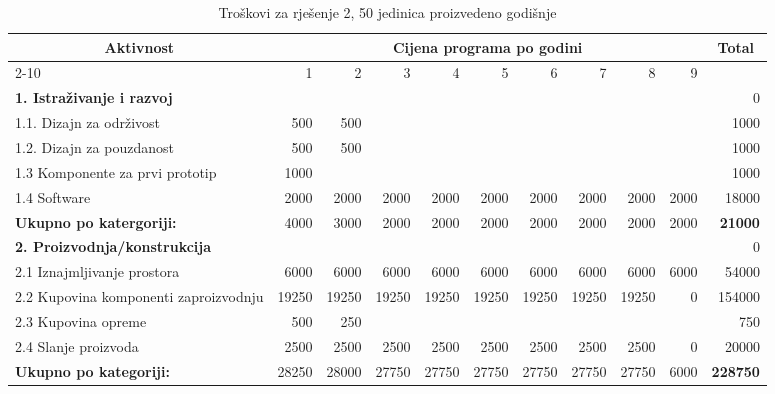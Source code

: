 \documentclass[12pt]{article}
\begin{document}
\begin{landscape}
\begin{table}[htbp]
  \centering
  \small
  \caption{Troškovi za rješenje 2, 50 jedinica proizvedeno godišnje}
    \begin{tabular}{lrrrrrrrrrr}
    \toprule
    \multicolumn{1}{c}{\multirow{2}[4]{*}{Aktivnost}} & \multicolumn{9}{c}{Cijena programa po godini}                         & \multicolumn{1}{c}{\multirow{2}[4]{*}{Total}} \\
\cmidrule{2-10}          & 1     & 2     & 3     & 4     & 5     & 6     & 7     & 8     & 9     &  \\
    \midrule
\textbf{1. Istraživanje i razvoj} &       &       &       &       &       &       &       &       &       & 0 \\
    1.1. Dizajn za održivost & 500   & 500   &       &       &       &       &       &       &       & 1000 \\
    1.2. Dizajn za pouzdanost & 500   & 500   &       &       &       &       &       &       &       & 1000 \\
    1.3 Komponente za prvi prototip & 1000  &       &       &       &       &       &       &       &       & 1000 \\
    1.4 Software & 2000  & 2000  & 2000  & 2000  & 2000  & 2000  & 2000  & 2000  & 2000  & 18000 \\
    \midrule
    \textbf{Ukupno po katergoriji:} & 4000  & 3000  & 2000  & 2000  & 2000  & 2000  & 2000  & 2000  & 2000  & \textbf{21000} \\
    \midrule
    \textbf{2. Proizvodnja/konstrukcija} &       &       &       &       &       &       &       &       &       & 0 \\
    2.1 Iznajmljivanje prostora & 6000  & 6000  & 6000  & 6000  & 6000  & 6000  & 6000  & 6000  & 6000  & 54000 \\
    \multicolumn{1}{p{14.715em}}{2.2 Kupovina komponenti za\newline{}proizvodnju} & 19250 & 19250 & 19250 & 19250 & 19250 & 19250 & 19250 & 19250 & 0     & 154000 \\
    2.3 Kupovina opreme & 500   & 250   &       &       &       &       &       &       &       & 750 \\
    2.4 Slanje proizvoda & 2500  & 2500  & 2500  & 2500  & 2500  & 2500  & 2500  & 2500  & 0     & 20000 \\
    \midrule
    \textbf{Ukupno po kategoriji:} & 28250 & 28000 & 27750 & 27750 & 27750 & 27750 & 27750 & 27750 & 6000  & \textbf{228750} \\

\end{tabular}
\end{table}
\end{landscape}
\end{document}
